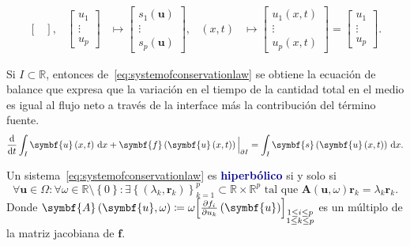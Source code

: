\begin{definition}
\begin{align*}
\begin{bmatrix}
		\end{bmatrix},                       &
		\begin{bmatrix}
			u_{1}  \\
			\vdots \\
			u_{p}
		\end{bmatrix}                                      &
		\longmapsto
		\begin{bmatrix}
			s_{1}\left(\symbf{u}\right) \\
			\vdots                      \\
			s_{p}\left(\symbf{u}\right)
		\end{bmatrix},                       &
		\left(x,t\right)                                     &
		\longmapsto
		\begin{bmatrix}
			u_{1}\left(x,t\right) \\
			\vdots                \\
			u_{p}\left(x,t\right)
		\end{bmatrix}=
		\begin{bmatrix}
			u_{1}  \\
			\vdots \\
			u_{p}
		\end{bmatrix}.
	\end{align*}
\end{definition}
Si $I\subset\mathbb{R}$, entonces
de~\eqref{eq:systemofconservationlaw} se obtiene la ecuación de
balance que expresa que la variación en el tiempo de la cantidad
total en el medio es igual al flujo neto a través de la interface
más la contribución del término fuente.
\begin{equation*}
	\diff{}{t}
	\int_{I}
	\symbf{u}\left(x,t\right)\dl x+
	{\symbf{f}\left(\symbf{u}\left(x,t\right)\right)\Big|}_{\partial I}=
	\int_{I}
	\symbf{s}\left(\symbf{u}\left(x,t\right)\right)\dl x.
\end{equation*}

\begin{definition}
	Un sistema~\eqref{eq:systemofconservationlaw} es
	\textcolor{DarkBlue}{\bfseries hiperbólico} si y
	solo si
	\begin{equation}
		\forall\symbf{u}\in\Omega\!:
		\forall\omega\in\mathbb{R}\setminus\left\{0\right\}\!:
		\exists
		{\left\{
			\left(\lambda_{k},\symbf{r}_{k}\right)
			\right\}}^{p}_{k=1}\subset
		\mathbb{R}\times\mathbb{R}^{p}
		\text{ tal que }
		\symbf{A}\left(\symbf{u},\omega\right)
		\symbf{r}_{k}=
		\lambda_{k}
		\symbf{r}_{k}.
	\end{equation}
	Donde
	\begin{math}
		\symbf{A}\left(\symbf{u},\omega\right)\coloneqq
		\omega
		{
			\begin{bmatrix}
				\diffp{f_{i}}{u_{k}}
				\left(\symbf{u}\right)
			\end{bmatrix}}_{\substack{1\leq i\leq p\\1\leq k\leq p}}
	\end{math}
	es un múltiplo de la matriz jacobiana de $\mathbf{f}$.
\end{definition}

